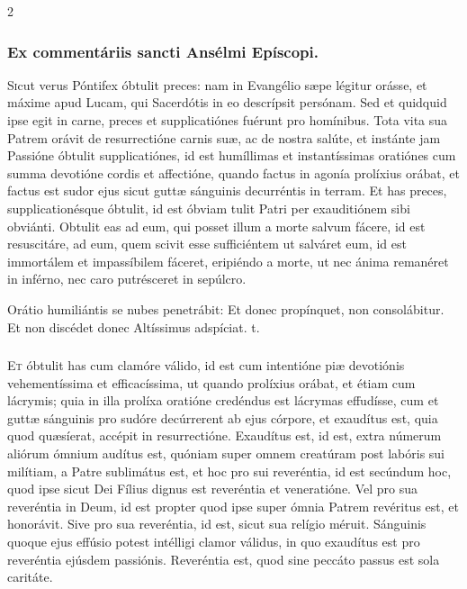 \documentclass[9pt,twoside]{extarticle}
\begin{document}
\begin{multicols}{2}
\subsubsection*{\center Ex commentáriis sancti Ansélmi Epíscopi.}
\begin{center}\end{center}
\lettrine{S}icut verus Póntifex óbtulit preces: nam in Evangélio sæpe légitur orásse, et máxime apud Lucam, qui Sacerdótis in eo descrípsit persónam. Sed et quidquid ipse egit in carne, preces et supplicatiónes fuérunt pro homínibus. Tota vita sua Patrem orávit de resurrectióne carnis suæ, ac de nostra salúte, et instánte jam Passióne óbtulit supplicatiónes, id est humíllimas et instantíssimas oratiónes cum summa devotióne cordis et affectióne, quando factus in agonía prolíxius orábat, et factus est sudor ejus sicut guttæ sánguinis decurréntis in terram. Et has preces, supplicationésque óbtulit, id est óbviam tulit Patri per exauditiónem sibi obviánti. Obtulit eas ad eum, qui posset illum a morte salvum fácere, id est resuscitáre, ad eum, quem scivit esse sufficiéntem ut salváret eum, id est immortálem et impassíbilem fáceret, eripiéndo a morte, ut nec ánima remanéret in inférno, nec caro putrésceret in sepúlcro.

\begin{tightlist}{}
\item {} Orátio humiliántis se nubes penetrábit: \textred{*} Et donec propínquet, non consolábitur.  Et non discédet donec Altíssimus adspíciat. t.
\end{tightlist}

\subsubsection*{\center{}}
\lettrine{E}t óbtulit has cum clamóre válido, id est cum intentióne piæ devotiónis vehementíssima et efficacíssima, ut quando prolíxius orábat, et étiam cum lácrymis; quia in illa prolíxa oratióne credéndus est lácrymas effudísse, cum et guttæ sánguinis pro sudóre decúrrerent ab ejus córpore, et exaudítus est, quia quod quæsíerat, accépit in resurrectióne. Exaudítus est, id est, extra númerum aliórum ómnium audítus est, quóniam super omnem creatúram post labóris sui milítiam, a Patre sublimátus est, et hoc pro sui reveréntia, id est secúndum hoc, quod ipse sicut Dei Fílius dignus est reveréntia et veneratióne. Vel pro sua reveréntia in Deum, id est propter quod ipse super ómnia Patrem revéritus est, et honorávit. Sive pro sua reveréntia, id est, sicut sua relígio méruit. Sánguinis quoque ejus effúsio potest intélligi clamor válidus, in quo exaudítus est pro reveréntia ejúsdem passiónis. Reveréntia est, quod sine peccáto passus est sola caritáte.


\end{multicols}
\end{document}
